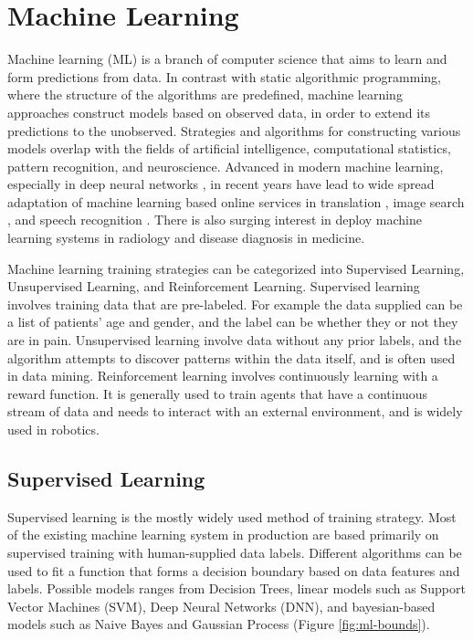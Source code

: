 \section{Machine Learning}
Machine learning (ML) is a branch of computer science that aims to learn and form predictions from data. In contrast with static algorithmic programming, where the structure of the algorithms are predefined, machine learning approaches construct models based on observed data, in order to extend its predictions to the unobserved. Strategies and algorithms for constructing various models overlap with the fields of artificial intelligence, computational statistics, pattern recognition, and neuroscience. Advanced in modern machine learning, especially in deep neural networks \cite{LeCun2015}, in recent years have lead to wide spread adaptation of machine learning based online services in translation \cite{bahdanau2014neural}, image search \cite{simonyan2014very}, and speech recognition \cite{graves2013speech}. There is also surging interest in deploy machine learning systems in radiology and disease diagnosis in medicine. 

Machine learning training strategies can be categorized into Supervised Learning, Unsupervised Learning, and Reinforcement Learning. Supervised learning involves training data that are pre-labeled. For example the data supplied can be a list of patients' age and gender, and the label can be whether they or not they are in pain. Unsupervised learning involve data without any prior labels, and the algorithm attempts to discover patterns within the data itself, and is often used in data mining. Reinforcement learning involves continuously learning with a reward function. It is generally used to train agents that have a continuous stream of data and needs to interact with an external environment, and is widely used in robotics.

\subsection{Supervised Learning}
Supervised learning is the mostly widely used method of training strategy. Most of the existing machine learning system in production are based primarily on supervised training with human-supplied data labels. Different algorithms can be used to fit a function that forms a decision boundary based on data features and labels. Possible models ranges from Decision Trees, linear models such as Support Vector Machines (SVM), Deep Neural Networks (DNN), and bayesian-based models such as Naive Bayes and Gaussian Process (Figure \ref{fig:ml-bounds}).

